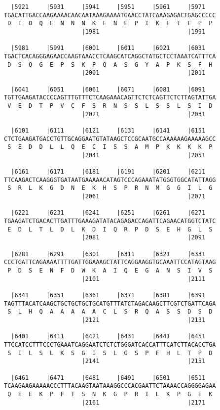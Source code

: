 \documentclass{article}
\begin{document}
\begin{Verbatim}
  |5921     |5931     |5941     |5951     |5961     |5971   
TGACATTGACCAAGAAAACAACAATAAAGAAAATGAACCTATCAAAGAGACTGAGCCCCC
 D  I  D  Q  E  N  N  N  K  E  N  E  P  I  K  E  T  E  P  P 
                      |1981                         |1991   
  
  |5981     |5991     |6001     |6011     |6021     |6031   
TGACTCACAGGGAGAACCAAGTAAACCTCAAGCATCAGGCTATGCTCCTAAATCATTTCA
 D  S  Q  G  E  P  S  K  P  Q  A  S  G  Y  A  P  K  S  F  H 
                      |2001                         |2011   
  
  |6041     |6051     |6061     |6071     |6081     |6091   
TGTTGAAGATACCCCAGTTTGTTTCTCAAGAAACAGTTCTCTCAGTTCTCTTAGTATTGA
 V  E  D  T  P  V  C  F  S  R  N  S  S  L  S  S  L  S  I  D 
                      |2021                         |2031   
  
  |6101     |6111     |6121     |6131     |6141     |6151   
CTCTGAAGATGACCTGTTGCAGGAATGTATAAGCTCCGCAATGCCAAAAAAGAAAAAGCC
 S  E  D  D  L  L  Q  E  C  I  S  S  A  M  P  K  K  K  K  P 
                      |2041                         |2051   
  
  |6161     |6171     |6181     |6191     |6201     |6211   
TTCAAGACTCAAGGGTGATAATGAAAAACATAGTCCCAGAAATATGGGTGGCATATTAGG
 S  R  L  K  G  D  N  E  K  H  S  P  R  N  M  G  G  I  L  G 
                      |2061                         |2071   
  
  |6221     |6231     |6241     |6251     |6261     |6271   
TGAAGATCTGACACTTGATTTGAAAGATATACAGAGACCAGATTCAGAACATGGTCTATC
 E  D  L  T  L  D  L  K  D  I  Q  R  P  D  S  E  H  G  L  S 
                      |2081                         |2091   
  
  |6281     |6291     |6301     |6311     |6321     |6331   
CCCTGATTCAGAAAATTTTGATTGGAAAGCTATTCAGGAAGGTGCAAATTCCATAGTAAG
 P  D  S  E  N  F  D  W  K  A  I  Q  E  G  A  N  S  I  V  S 
                      |2101                         |2111   
  
  |6341     |6351     |6361     |6371     |6381     |6391   
TAGTTTACATCAAGCTGCTGCTGCTGCATGTTTATCTAGACAAGCTTCGTCTGATTCAGA
 S  L  H  Q  A  A  A  A  A  C  L  S  R  Q  A  S  S  D  S  D 
                      |2121                         |2131   
  
  |6401     |6411     |6421     |6431     |6441     |6451   
TTCCATCCTTTCCCTGAAATCAGGAATCTCTCTGGGATCACCATTTCATCTTACACCTGA
 S  I  L  S  L  K  S  G  I  S  L  G  S  P  F  H  L  T  P  D 
                      |2141                         |2151   
  
  |6461     |6471     |6481     |6491     |6501     |6511   
TCAAGAAGAAAAACCCTTTACAAGTAATAAAGGCCCACGAATTCTAAAACCAGGGGAGAA
 Q  E  E  K  P  F  T  S  N  K  G  P  R  I  L  K  P  G  E  K 
                      |2161                         |2171   
  

\end{Verbatim}
\end{document}
